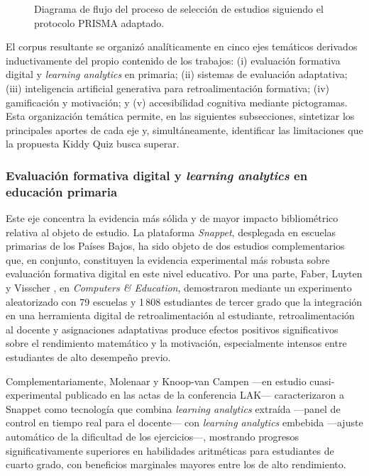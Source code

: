 \begin{figure}[H]
\caption{Diagrama de flujo del proceso de selección de estudios siguiendo el protocolo PRISMA adaptado.}
\label{fig:prisma}
\end{figure}
\elaboracion

\noindent El corpus resultante se organizó analíticamente en cinco ejes temáticos derivados inductivamente del propio contenido de los trabajos: (i) evaluación formativa digital y \textit{learning analytics} en primaria; (ii) sistemas de evaluación adaptativa; (iii) inteligencia artificial generativa para retroalimentación formativa; (iv) gamificación y motivación; y (v) accesibilidad cognitiva mediante pictogramas. Esta organización temática permite, en las siguientes subsecciones, sintetizar los principales aportes de cada eje y, simultáneamente, identificar las limitaciones que la propuesta Kiddy Quiz busca superar.

\subsubsection{Evaluación formativa digital y \textit{learning analytics} en educación primaria}

Este eje concentra la evidencia más sólida y de mayor impacto bibliométrico relativa al objeto de estudio. La plataforma \textit{Snappet}, desplegada en escuelas primarias de los Países Bajos, ha sido objeto de dos estudios complementarios que, en conjunto, constituyen la evidencia experimental más robusta sobre evaluación formativa digital en este nivel educativo. Por una parte, Faber, Luyten y Visscher \cite{faber2017dfa}, en \textit{Computers \& Education}, demostraron mediante un experimento aleatorizado con 79 escuelas y 1\,808 estudiantes de tercer grado que la integración en una herramienta digital de retroalimentación al estudiante, retroalimentación al docente y asignaciones adaptativas produce efectos positivos significativos sobre el rendimiento matemático y la motivación, especialmente intensos entre estudiantes de alto desempeño previo.

Complementariamente, Molenaar y Knoop-van Campen \cite{molenaar2016snappet} ---en estudio cuasi-ex\-pe\-ri\-men\-tal publicado en las actas de la conferencia LAK--- caracterizaron a Snappet como tecnología que combina \textit{learning analytics} extraída ---panel de control en tiempo real para el docente--- con \textit{learning analytics} embebida ---ajuste automático de la dificultad de los ejercicios---, mostrando progresos significativamente superiores en habilidades aritméticas para estudiantes de cuarto grado, con beneficios marginales mayores entre los de alto rendimiento.

